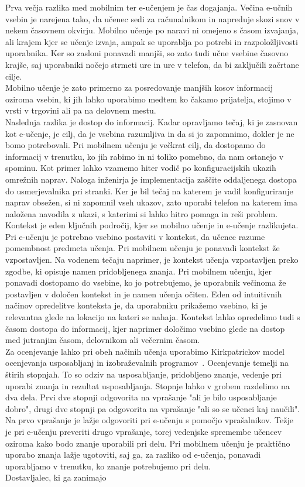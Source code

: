 \documentclass[a4paper, 12pt]{book}
\begin{document}
Prva večja razlika med mobilnim ter e-učenjem je čas dogajanja. Večina e-učnih vsebin je narejena tako, da učenec sedi za računalnikom in napreduje skozi snov v nekem časovnem okvirju. Mobilno učenje po naravi ni omejeno s časom izvajanja, ali krajem kjer se učenje izvaja, ampak se uporablja po potrebi in razpoložljivosti uporabnika. Ker so zasloni ponavadi manjši, so zato tudi učne vsebine časovno krajše, saj uporabniki nočejo strmeti ure in ure v telefon, da bi zaključili začrtane cilje. \\ Mobilno učenje je zato primerno za posredovanje manjših kosov informacij oziroma vsebin, ki jih lahko uporabimo medtem ko čakamo prijatelja, stojimo v vrsti v trgovini ali pa na delovnem mestu. \\Naslednja razlika je dostop do informacij. Kadar opravljamo tečaj, ki je zasnovan kot e-učenje, je cilj, da je vsebina razumljiva in da si jo zapomnimo, dokler je ne bomo potrebovali. Pri mobilnem učenju je večkrat cilj, da dostopamo do informacij v trenutku, ko jih rabimo in ni toliko pomebno, da nam ostanejo v spominu. Kot primer lahko vzamemo hiter vodič po konfiguracijskih ukazih omrežnih naprav. Naloga inženirja je implementacija zaščite oddaljenega dostopa do usmerjevalnika pri stranki. Ker je bil tečaj na katerem je vadil konfiguriranje naprav obsežen, si ni zapomnil vseh ukazov, zato uporabi telefon na katerem ima naložena navodila z ukazi, s katerimi si lahko hitro pomaga in reši problem.\\Kontekst je eden ključnih področij, kjer se mobilno učenje in e-učenje razlikujeta. Pri e-učenju je potrebno vsebino postaviti v kontekst, da učenec razume pomembnost predmeta učenja. Pri mobilnem učenju je ponavadi kontekst že vzpostavljen. Na vodenem tečaju naprimer, je kontekst učenja vzpostavljen preko zgodbe, ki opisuje namen pridobljenega znanja. Pri mobilnem učenju, kjer ponavadi dostopamo do vsebine, ko jo potrebujemo, je uporabnik večinoma že postavljen v določen kontekst in je namen učenja očiten. Eden od intuitivnih načinov opredelitve konteksta je, da uporabniku prikažemo vsebino, ki je relevantna glede na lokacijo na kateri se nahaja. Kontekst lahko opredelimo tudi s časom dostopa do informacij, kjer naprimer določimo vsebino glede na dostop med jutranjim časom, delovnikom ali večernim časom.\\Za ocenjevanje lahko pri obeh načinih učenja uporabimo Kirkpatrickov model ocenjevanja usposabljanj in izobraževalnih programov~\cite{Kirkpatrick}. Ocenjevanje temelji na štirih stopnjah. To so odziv na usposabljanje, pridobljeno znanje, vedenje pri uporabi znanja in rezultat usposabljanja. Stopnje lahko v grobem razdelimo na dva dela. Prvi dve stopnji odgovorita na vprašanje "ali je bilo usposabljanje dobro", drugi dve stopnji pa odgovorita na vprašanje "ali so se učenci kaj naučili". Na prvo vprašanje je lažje odgovoriti pri e-učenju s pomočjo vprašalnikov. Težje je pri e-učenju preveriti drugo vprašanje, torej vedenjske spremembe učencev oziroma kako bodo znanje uporabili pri delu. Pri mobilnem učenju je praktično uporabo znanja lažje ugotoviti, saj ga, za razliko od e-učenja, ponavadi uporabljamo v trenutku, ko znanje potrebujemo pri delu.\\ Dostavljalec, ki ga zanimajo 
\end{document}
